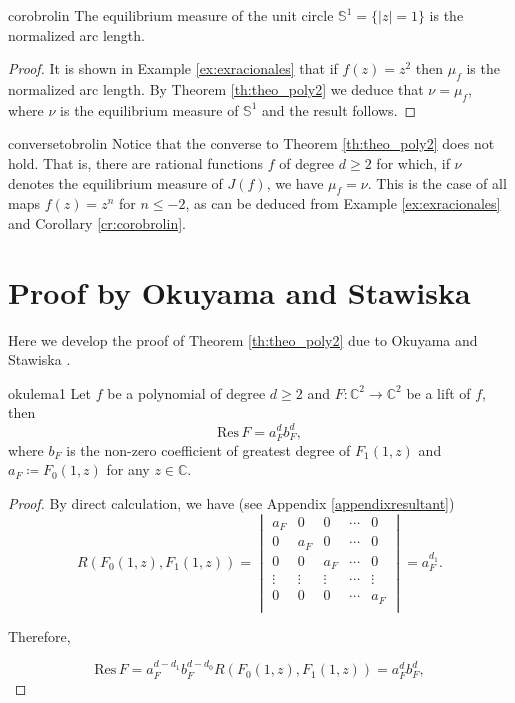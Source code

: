 \begin{mycoro}{}{corobrolin}
The equilibrium measure of the unit circle $\mathbb{S}^1=\{|z|=1\}$ is the normalized arc length.
\end{mycoro}

\begin{proof}
It is shown in Example \ref{ex:exracionales} that if $f(z)=z^2$ then $\mu_f$ is the normalized arc length. By Theorem \ref{th:theo_poly2} we deduce that $\nu=\mu_f$, where $\nu$ is the equilibrium measure of $\mathbb{S}^1$ and the result follows.
\end{proof}

\begin{myrmk}{}{conversetobrolin}
Notice that the converse to Theorem \ref{th:theo_poly2} does not hold. That is, there are rational functions $f$ of degree $d\geq 2$ for which, if $\nu$ denotes the equilibrium measure of $J(f)$, we have $\mu_f=\nu$. This is the case of all maps $f(z)=z^n$ for $n\leq -2$, as can be deduced from Example \ref{ex:exracionales} and Corollary \ref{cr:corobrolin}.
\end{myrmk}

\section{Proof by Okuyama and Stawiska}\label{pruebadeokuyama}

Here we develop the proof of Theorem \ref{th:theo_poly2} due to Okuyama and Stawiska \cite{okuyama}.\\

\begin{mylema}{}{okulema1}
Let $f$ be a polynomial of degree $d\geq 2$ and $F:\mathbb{C}^2 \rightarrow \mathbb{C}^2$ be a lift of $f$, then
\begin{equation}\label{Resequ}
\text{Res}\, F = a_F^{d}b_F^d,
\end{equation}
where $b_F$ is the non-zero coefficient of greatest degree of $F_1(1,z)$ and $a_F\coloneqq F_0(1,z)$ for any $z\in\mathbb{C}$.
\end{mylema}

\begin{proof}
By direct calculation, we have (see Appendix \ref{appendixresultant})
$$R(F_0(1,z),F_1(1,z)) = \begin{vmatrix}
a_F & 0    & 0 &\cdots &0\\
0   & a_F  & 0 &\cdots &0\\
0   & 0    &a_F &\cdots &0\\
\vdots   & \vdots  & \vdots &\cdots &\vdots\\
0   & 0  & 0 &\cdots & a_F\\
\end{vmatrix} = a_F^{d_1}.$$

Therefore,

\begin{equation}\label{Resequ}
\text{Res}\, F = a_F^{d-d_1}b_F^{d-d_0}R(F_0(1,z),F_1(1,z)) = a_F^{d}b_F^d,
\end{equation}
\end{proof}


